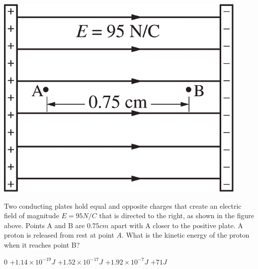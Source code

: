 
\begin{center}
    \includegraphics[scale=0.3]{images/img-005-005.png}
\end{center}

\begin{questions}
\setcounter{question}{7}

\question
Two conducting plates hold equal and opposite charges that create an electric field of magnitude $E = 95 \unit{N/C}$ that is directed to the right, as shown in the figure above. Points $\mathrm{A}$ and $\mathrm{B}$ are $0.75 \unit{cm}$ apart with $\mathrm{A}$ closer to the positive plate. A proton is released from rest at point $A$. What is the kinetic energy of the proton when it reaches point B?

\begin{choices}
    \choice $0$
    \choice $+1.14 \times 10^{-19} \unit{J}$
    \choice $+1.52 \times 10^{-17} \unit{J}$
    \choice $+1.92 \times 10^{-7} \unit{J}$
    \choice $+71 \unit{J}$
\end{choices}

\end{questions}
